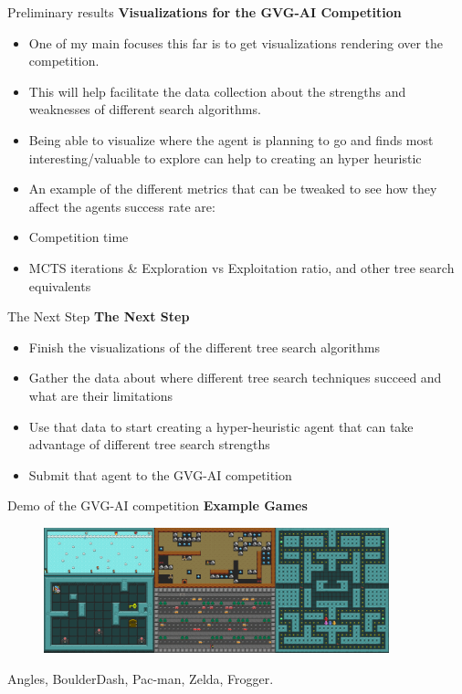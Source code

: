\documentclass{beamer}
\begin{document}
\begin{frame}{Preliminary results}
\textbf{Visualizations for the GVG-AI Competition}
		\begin{itemize}
			\item One of my main focuses this far is to get visualizations rendering over the competition. \pause
			\item This will help facilitate the data collection about the strengths and weaknesses of different search algorithms. \pause
			\item Being able to visualize where the agent is planning to go and finds most interesting/valuable to explore can help to creating an hyper heuristic \pause
		\end{itemize}
		
		\begin{itemize}
			\item An example of the different metrics that can be tweaked to see how they affect the agents success rate are: \pause
			\item Competition time \pause
			\item MCTS iterations \& Exploration vs Exploitation ratio, and other tree search equivalents 
		\end{itemize}
\end{frame}

\begin{frame}{The Next Step}
\textbf{The Next Step}
		\begin{itemize}
			\item Finish the visualizations of the different tree search algorithms \pause
			\item Gather the data about where different tree search techniques succeed and what are their limitations \pause
			\item Use that data to start creating a hyper-heuristic agent that can take advantage of different tree search strengths \pause
			\item Submit that agent to the GVG-AI competition
		\end{itemize}
\end{frame}

\begin{frame}{Demo of the GVG-AI competition}
		\textbf{Example Games}
		\begin{figure}[t]
				\includegraphics[width=10cm]{VGDL}
		\end{figure} 
		Angles, BoulderDash, Pac-man, Zelda, Frogger.
		
\end{frame}
\end{document}
